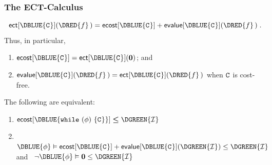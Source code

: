 \documentclass[
11pt,
usepdftitle=false,
aspectratio=169,
xcolor={table,usenames,dvipsnames},
]{beamer}
\begin{document}
\begin{frame}[t,fragile]
  \frametitle{The ECT-Calculus}
  \vspace{-2ex}
  \begin{theorem}[Correctness]
    \[
      \ect{\DBLUE{\cmd}}(\DRED{f}\,) = \ec{\DBLUE{\cmd}} + \ev{\DBLUE{\cmd}}(\DRED{f}\,)
      \tpkt
    \]
    Thus, in particular,
    \begin{enumerate}
    \item $\ec{\DBLUE{\cmd}} = \ect{\DBLUE{\cmd}}(\mathbf{0})$; and \smallskip
    \item $\ev{\DBLUE{\cmd}}(\DRED{f}\,) = \ect{\DBLUE{\cmd}}(\DRED{f}\,)$ when ${\mathtt{C}_{\mathsf{}}}$ is cost-free.
    \end{enumerate}
    \phantom{X}\bskip
  \end{theorem}
  \pause

  \begin{theorem}
    \renewcommand{\I}{\DGREEN{\mathcal{I}}}
    The following are equivalent:\medskip
    \begin{enumerate}
    \item $\ec{\DBLUE{\whilec{\bexp}{\cmd}}} \leqf \I$ \medskip
    \item {}~$\DBLUE{\bexp} \entails \ec{\DBLUE{\cmd}} + \ev{\DBLUE{\cmd}}(\I) \leq \I$ and ~$\neg\DBLUE{\bexp} \entails \mathbf{0} \leq \I$
    \end{enumerate}
  \end{theorem}


\end{frame}
\end{document}
